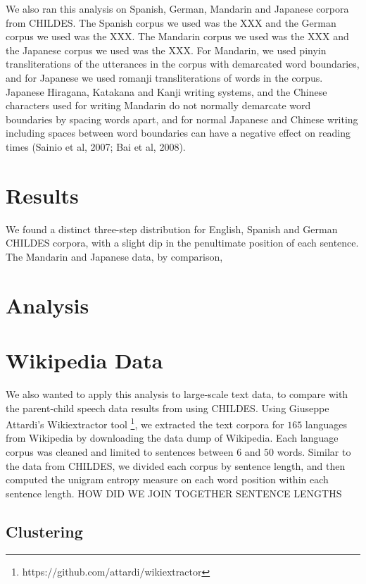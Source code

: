 \documentclass[10pt, letterpaper]{article}
\begin{document}
We also ran this analysis on Spanish, German, Mandarin and Japanese
corpora from CHILDES. The Spanish corpus we used was the XXX and the
German corpus we used was the XXX. The Mandarin corpus we used was the
XXX and the Japanese corpus we used was the XXX. For Mandarin, we used
pinyin transliterations of the utterances in the corpus with demarcated
word boundaries, and for Japanese we used romanji transliterations of
words in the corpus. Japanese Hiragana, Katakana and Kanji writing
systems, and the Chinese characters used for writing Mandarin do not
normally demarcate word boundaries by spacing words apart, and for
normal Japanese and Chinese writing including spaces between word
boundaries can have a negative effect on reading times (Sainio et al,
2007; Bai et al, 2008).

\section{Results}\label{results}

We found a distinct three-step distribution for English, Spanish and
German CHILDES corpora, with a slight dip in the penultimate position of
each sentence. The Mandarin and Japanese data, by comparison,

\section{Analysis}\label{analysis}

\section{Wikipedia Data}\label{wikipedia-data}

We also wanted to apply this analysis to large-scale text data, to
compare with the parent-child speech data results from using CHILDES.
Using Giuseppe Attardi's Wikiextractor tool
\footnote{https://github.com/attardi/wikiextractor}, we extracted the
text corpora for \(165\) languages from Wikipedia by downloading the
data dump of Wikipedia. Each language corpus was cleaned and limited to
sentences between \(6\) and \(50\) words. Similar to the data from
CHILDES, we divided each corpus by sentence length, and then computed
the unigram entropy measure on each word position within each sentence
length. HOW DID WE JOIN TOGETHER SENTENCE LENGTHS

\subsection{Clustering}\label{clustering}
\end{document}
